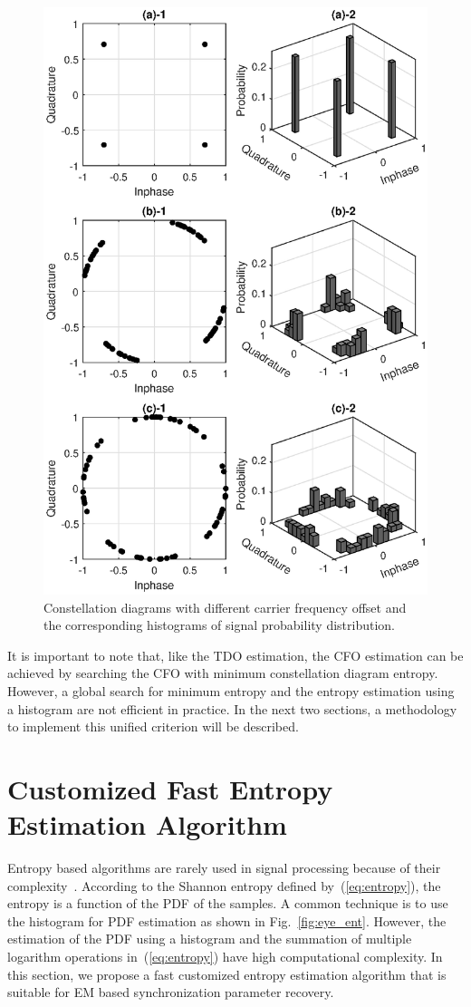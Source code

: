 \documentclass[journal,comsoc]{IEEEtran}
\begin{document}
\begin{figure}[ht]
\centering
\includegraphics[width=3 in]{pic/const_hst-k.eps}
\caption{Constellation diagrams with different carrier frequency offset and the corresponding histograms of signal probability distribution.}
\label{fig:const_hst} 
\end{figure}

It is important to note that, like the TDO estimation, the CFO estimation can be achieved by searching the CFO with minimum constellation diagram entropy.
However, a global search for minimum entropy and the entropy estimation using a histogram are not efficient in practice.
In the next two sections, a methodology to implement this unified criterion will be described.

\section{Customized Fast Entropy Estimation Algorithm}
\label{sec:cust_entp}
Entropy based algorithms are rarely used in signal processing because of their complexity~\cite{Bercher2000}.
According to the Shannon entropy defined by~(\ref{eq:entropy}), the entropy is a function of the PDF of the samples.
A common technique is to use the histogram for PDF estimation as shown in Fig.~\ref{fig:eye_ent}.
However, the estimation of the PDF using a histogram and the summation of multiple logarithm operations  in~(\ref{eq:entropy}) have high computational complexity.
In this section, we propose a fast customized entropy estimation algorithm that is suitable for EM based synchronization parameter recovery. 
\end{document}
